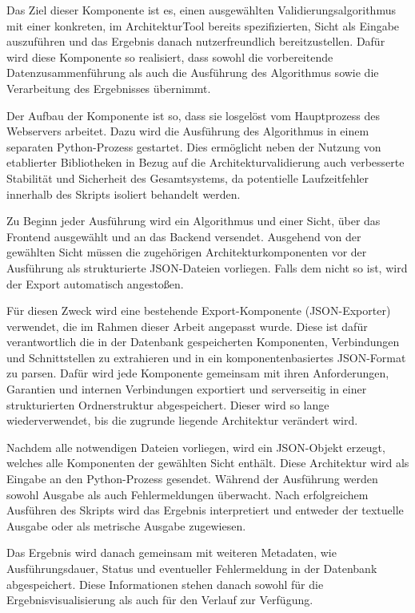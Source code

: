 Das Ziel dieser Komponente ist es, einen ausgewählten Validierungsalgorithmus mit einer konkreten, im ArchitekturTool bereits spezifizierten, Sicht als Eingabe auszuführen und das Ergebnis danach nutzerfreundlich bereitzustellen. Dafür wird diese Komponente so realisiert, dass sowohl die vorbereitende Datenzusammenführung als auch die Ausführung des Algorithmus sowie die Verarbeitung des Ergebnisses übernimmt.

Der Aufbau der Komponente ist so, dass sie losgelöst vom Hauptprozess des Webservers arbeitet. Dazu wird die Ausführung des Algorithmus in einem separaten Python-Prozess gestartet. Dies ermöglicht neben der Nutzung von etablierter Bibliotheken in Bezug auf die Architekturvalidierung auch verbesserte Stabilität und Sicherheit des Gesamtsystems, da potentielle Laufzeitfehler innerhalb des Skripts isoliert behandelt werden.

Zu Beginn jeder Ausführung wird ein Algorithmus und einer Sicht, über das Frontend ausgewählt und an das Backend versendet. Ausgehend von der gewählten Sicht müssen die zugehörigen Architekturkomponenten vor der Ausführung als strukturierte JSON-Dateien vorliegen. Falls dem nicht so ist, wird der Export automatisch angestoßen.

Für diesen Zweck wird eine bestehende Export-Komponente (JSON-Exporter) verwendet, die im Rahmen dieser Arbeit angepasst wurde. Diese ist dafür verantwortlich die in der Datenbank gespeicherten Komponenten, Verbindungen und Schnittstellen zu extrahieren und in ein komponentenbasiertes JSON-Format zu parsen. Dafür wird jede Komponente gemeinsam mit ihren Anforderungen, Garantien und internen Verbindungen exportiert und serverseitig in einer strukturierten Ordnerstruktur abgespeichert. Dieser wird so lange wiederverwendet, bis die zugrunde liegende Architektur verändert wird.

Nachdem alle notwendigen Dateien vorliegen, wird ein JSON-Objekt erzeugt, welches alle Komponenten der gewählten Sicht enthält. Diese Architektur wird als Eingabe an den Python-Prozess gesendet. Während der Ausführung werden sowohl Ausgabe als auch Fehlermeldungen überwacht. Nach erfolgreichem Ausführen des Skripts wird das Ergebnis interpretiert und entweder der textuelle Ausgabe oder als metrische Ausgabe zugewiesen.

Das Ergebnis wird danach gemeinsam mit weiteren Metadaten, wie Ausführungsdauer, Status und eventueller Fehlermeldung in der Datenbank abgespeichert. Diese Informationen stehen danach sowohl für die Ergebnisvisualisierung als auch für den Verlauf zur Verfügung.